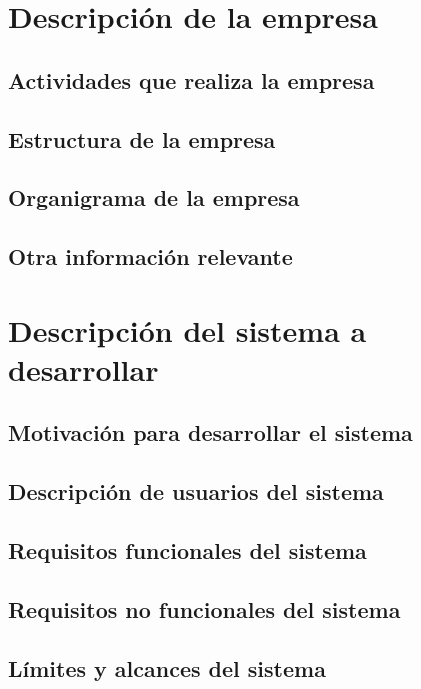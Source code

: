 \documentclass[11pt]{article}
\begin{document}
\newpage

\tableofcontents

\newpage
\section{Descripción de la empresa}

\subsection{Actividades que realiza la empresa}

\subsection{Estructura de la empresa}

\subsection{Organigrama de la empresa}

\subsection{Otra información relevante}

\section{Descripción del sistema a desarrollar}

\subsection{Motivación para desarrollar el sistema}

\subsection{Descripción de usuarios del sistema}

\subsection{Requisitos funcionales del sistema}

\subsection{Requisitos no funcionales del sistema}

\subsection{Límites y alcances del sistema}
\end{document}

